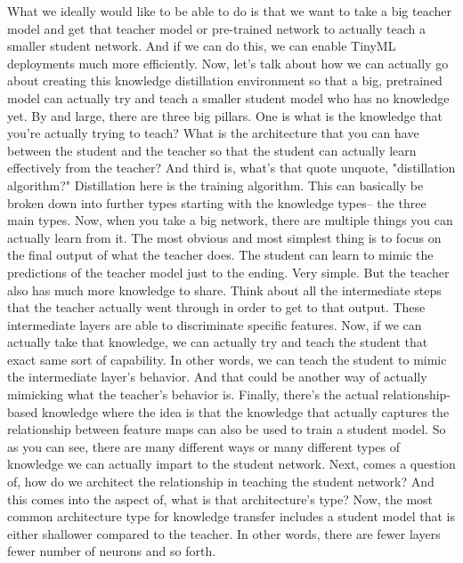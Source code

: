 {{{{{    What we ideally would like to be able to do
    is that we want to take a big teacher model
    and get that teacher model or pre-trained network
    to actually teach a smaller student network.
    And if we can do this, we can enable TinyML deployments
    much more efficiently.
    Now, let's talk about how we can actually
    go about creating this knowledge distillation environment so
    that a big, pretrained model can actually try and teach a smaller
    student model who has no knowledge yet.
    By and large, there are three big pillars.
    One is what is the knowledge that you're actually trying to teach?
    What is the architecture that you can have
    between the student and the teacher so that the student can actually
    learn effectively from the teacher?
    And third is, what's that quote unquote, "distillation algorithm?"
    Distillation here is the training algorithm.
    This can basically be broken down into further types
    starting with the knowledge types-- the three main types.
    Now, when you take a big network, there are multiple things
    you can actually learn from it.
    The most obvious and most simplest thing is
    to focus on the final output of what the teacher does.
    The student can learn to mimic the predictions of the teacher model
    just to the ending.
    Very simple.
    But the teacher also has much more knowledge to share.
    Think about all the intermediate steps that the teacher actually went through
    in order to get to that output.
    These intermediate layers are able to discriminate specific features.
    Now, if we can actually take that knowledge,
    we can actually try and teach the student
    that exact same sort of capability.
    In other words, we can teach the student to mimic the intermediate layer's
    behavior.
    And that could be another way of actually mimicking
    what the teacher's behavior is.
    Finally, there's the actual relationship-based knowledge
    where the idea is that the knowledge that actually captures
    the relationship between feature maps can also
    be used to train a student model.
    So as you can see, there are many different ways or many different types
    of knowledge we can actually impart to the student network.
    Next, comes a question of, how do we architect the relationship
    in teaching the student network?
    And this comes into the aspect of, what is that architecture's type?
    Now, the most common architecture type for knowledge transfer
    includes a student model that is either shallower compared to the teacher.
    In other words, there are fewer layers fewer number of neurons and so forth.
}}}}}

